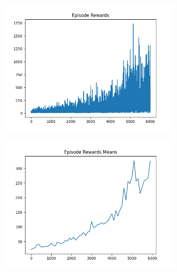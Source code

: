 \begin{figure}[H]
    \centering
    \begin{subfigure}{.47\linewidth}
        \centering
        \includegraphics[width=\textwidth]{pole/2024-06-14_18-50-42_dqn_cartpole_episode_rewards.png}
    \end{subfigure}
    \begin{subfigure}{.47\linewidth}
        \centering
        \includegraphics[width=\textwidth]{pole/2024-06-14_18-50-42_dqn_cartpole_episode_rewards_means.png}
    \end{subfigure}
    \begin{subfigure}{.47\linewidth}
        \centering

\end{subfigure}
\end{figure}
